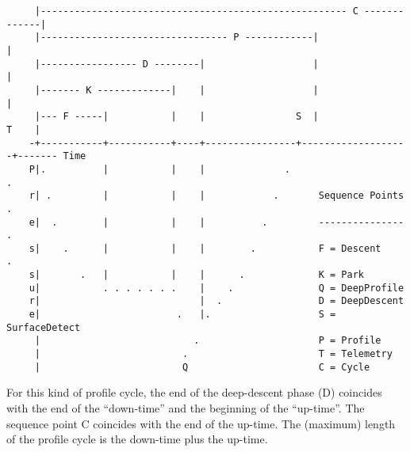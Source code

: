 \begin{minipage}{6in}
   \begin{verbatim}
     |------------------------------------------------------ C -------------|     
     |--------------------------------- P ------------|                     |     
     |----------------- D --------|                   |                     |     
     |------- K -------------|    |                   |                     |     
     |--- F -----|           |    |                S  |                T    |     
    -+-----------+-----------+----+----------------+-------------------+------- Time
    P|.          |           |    |              .                      .    
    r| .         |           |    |            .       Sequence Points   .   
    e|  .        |           |    |          .         ---------------    .  
    s|    .      |           |    |        .           F = Descent          .
    s|       .   |           |    |      .             K = Park                        
    u|           . . . . . . .    |    .               Q = DeepProfile 
    r|                            |  .                 D = DeepDescent
    e|                        .   |.                   S = SurfaceDetect
     |                           .                     P = Profile
     |                         .                       T = Telemetry 
     |                         Q                       C = Cycle                             
   \end{verbatim}
\end{minipage}

For this kind of profile cycle, the end of the deep-descent phase (D)
coincides with the end of the ``down-time'' and the beginning of the
``up-time''.  The sequence point C coincides with the end of the up-time.
The (maximum) length of the profile cycle is the down-time plus the up-time.

